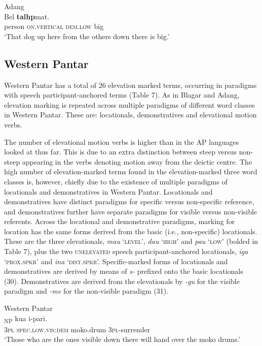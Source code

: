\ea%
\label{ex:29}
   Adang \citep[188]{Haan2001}     \\
\gll  Bel  \textbf{{tal}}\textbf{{{\textepsilon}}}\textbf{{h}}\textbf{{{\textepsilon}p{\textopeno}}}{mat}{{\textepsilon}.}  \\
   person  \textsc{on.vertical} \textsc{dem.low} big    \\
\glt   `That dog up here from the others down there is big.'
\z







\subsection{Western Pantar}
Western Pantar has a total of 26 elevation marked terms, occurring in paradigms with speech participant-anchored terms (Table 7). As in Blagar and Adang, elevation marking is repeated across multiple paradigms of different word classes in Western Pantar. These are: locationals, demonstratives and elevational motion verbs.

The number of elevational motion verbs is higher than in the AP languages looked at thus far. This is due to an extra distinction between steep versus non-steep appearing in the verbs denoting motion away from the deictic centre. The high number of elevation-marked terms found in the elevation-marked three word classes is, however, chiefly due to the existence of multiple paradigms of locationals and demonstratives in Western Pantar. Locationals and demonstratives have distinct paradigms for specific versus non-specific reference, and demonstratives further have separate paradigms for visible versus non-visible referents. Across the locational and demonstrative paradigms, marking for location has the same forms derived from the basic (i.e., non-specific) locationals. These are the three elevationals, \textit{mau} `\textsc{level',} \textit{dau} `\textsc{high'} and \textit{pau} `\textsc{low'} (bolded in Table 7)\textsc{,} plus the two \textsc{unelevated} speech participant-anchored locationals, \textit{iga} `\textsc{prox.spkr'} and \textit{ina} `\textsc{dist.spkr'.} Specific-marked forms of locationals and demonstratives are derived by means of \textit{s-} prefixed onto the basic locationals (30). Demonstratives are derived from the elevationals by \textit{{}-gu} for the visible paradigm and \textit{{}-me} for the non-visible paradigm (31).



\ea%
\label{ex:30}
  Western Pantar \citep{Holton2011}    \\
\textsubscript{NP} kua {\ng}  i-pari{\ng}.\\
    \textsc{3pl} \textsc{spec.low.vis:dem} moko.drum  \textsc{3pl-}surrender\\
\glt `Those who are the ones visible down there will hand over the moko drums.'
\z








